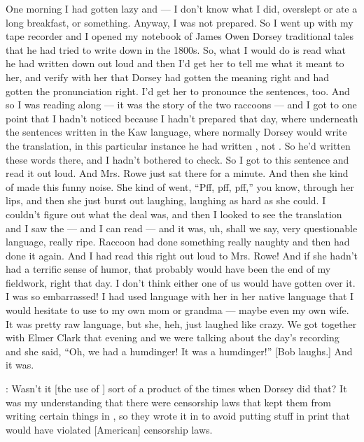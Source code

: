 \documentclass[output=paper]{LSP/langsci}
\begin{document}
One morning I had gotten lazy and --- I don't know what I did, overslept or ate a long breakfast, or something. Anyway, I was not prepared. So I went up with my tape recorder and I opened my notebook of James Owen Dorsey traditional tales that he had tried to write down in the 1800s. So, what I would do is read what he had written down out loud and then I'd get her to tell me what it meant to her, and verify with her that Dorsey had gotten the meaning right and had gotten the pronunciation right. I'd get her to pronounce the sentences, too. And so I was reading along --- it was the story of the two raccoons --- and I got to one point that I hadn't noticed because I hadn't prepared that day, where underneath the sentences written in the Kaw language, where normally Dorsey would write the  translation, in this particular instance he had written , not . So he'd written these  words there, and I hadn't bothered to check. So I got to this sentence and read it out loud. And Mrs. Rowe just sat there for a minute. And then she kind of made this funny noise. She kind of went, ``Pff, pff, pff,'' you know, through her lips, and then she just burst out laughing, laughing as hard as she could. I couldn't figure out what the deal was, and then I looked to see the translation and I saw the  --- and I can read  --- and it was, uh, shall we say, very questionable language, really ripe. Raccoon had done something really naughty and then had done it again. And I had read this right out loud to Mrs. Rowe! And if she hadn't had a terrific sense of humor, that probably would have been the end of my fieldwork, right that day. I don't think either one of us would have gotten over it. I was so embarrassed! I had used language with her in her native language that I would hesitate to use to my own mom or grandma --- maybe even my own wife. It was pretty raw language, but she, heh, just laughed like crazy. We got together with Elmer Clark that evening and we were talking about the day's recording and she said, ``Oh, we had a humdinger! It was a humdinger!'' [Bob laughs.] And it was.

: Wasn't it [the use of ] sort of a product of the times when Dorsey did that? It was my understanding that there were censorship laws that kept them from writing certain things in , so they wrote it in  to avoid putting stuff in print that would have violated [American] censorship laws.
\end{document}
